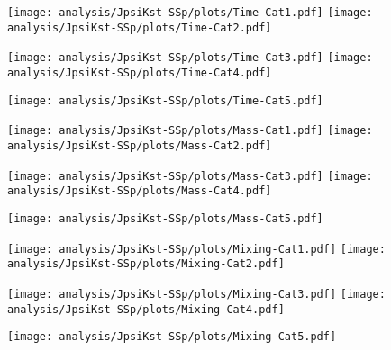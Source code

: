 \begin{figure}
  \texttt{[image: analysis/JpsiKst-SSp/plots/Time-Cat1.pdf]}
  \texttt{[image: analysis/JpsiKst-SSp/plots/Time-Cat2.pdf]}
\end{figure}
\begin{figure}
  \texttt{[image: analysis/JpsiKst-SSp/plots/Time-Cat3.pdf]}
  \texttt{[image: analysis/JpsiKst-SSp/plots/Time-Cat4.pdf]}
\end{figure}
\begin{figure}
  \centering
  \texttt{[image: analysis/JpsiKst-SSp/plots/Time-Cat5.pdf]}
\end{figure}
\begin{figure}
  \texttt{[image: analysis/JpsiKst-SSp/plots/Mass-Cat1.pdf]}
  \texttt{[image: analysis/JpsiKst-SSp/plots/Mass-Cat2.pdf]}
\end{figure}
\begin{figure}
  \texttt{[image: analysis/JpsiKst-SSp/plots/Mass-Cat3.pdf]}
  \texttt{[image: analysis/JpsiKst-SSp/plots/Mass-Cat4.pdf]}
\end{figure}
\begin{figure}
  \centering
  \texttt{[image: analysis/JpsiKst-SSp/plots/Mass-Cat5.pdf]}
\end{figure}

\begin{figure}
  \texttt{[image: analysis/JpsiKst-SSp/plots/Mixing-Cat1.pdf]}
  \texttt{[image: analysis/JpsiKst-SSp/plots/Mixing-Cat2.pdf]}
\end{figure}
\begin{figure}
  \texttt{[image: analysis/JpsiKst-SSp/plots/Mixing-Cat3.pdf]}
  \texttt{[image: analysis/JpsiKst-SSp/plots/Mixing-Cat4.pdf]}
\end{figure}
\begin{figure}
  \centering
  \texttt{[image: analysis/JpsiKst-SSp/plots/Mixing-Cat5.pdf]}
\end{figure}
